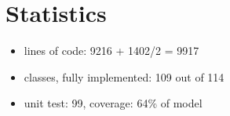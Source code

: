 \chapter{Statistics}
\begin{itemize}
\item lines of code: 9216 + 1402/2 = 9917
\item classes, fully implemented: 109 out of 114
\item unit test: 99, coverage: 64\% of model
\end{itemize}
